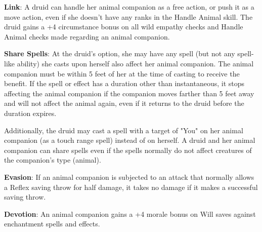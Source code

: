 \textbf{Link}: A druid can handle her animal companion as a free action, or push it as a move action, even if she doesn’t have any ranks in the Handle Animal skill. The druid gains a +4 circumstance bonus on all wild empathy checks and Handle Animal checks made regarding an animal companion.

\textbf{Share Spells}: At the druid’s option, she may have any spell (but not any spell-like ability) she casts upon herself also affect her animal companion. The animal companion must be within 5 feet of her at the time of casting to receive the benefit. If the spell or effect has a duration other than instantaneous, it stops affecting the animal companion if the companion moves farther than 5 feet away and will not affect the animal again, even if it returns to the druid before the duration expires.

Additionally, the druid may cast a spell with a target of "You" on her animal companion (as a touch range spell) instead of on herself. A druid and her animal companion can share spells even if the spells normally do not affect creatures of the companion’s type (animal).

\textbf{Evasion}: If an animal companion is subjected to an attack that normally allows a Reflex saving throw for half damage, it takes no damage if it makes a successful saving throw.

\textbf{Devotion}: An animal companion gains a +4 morale bonus on Will saves against enchantment spells and effects.